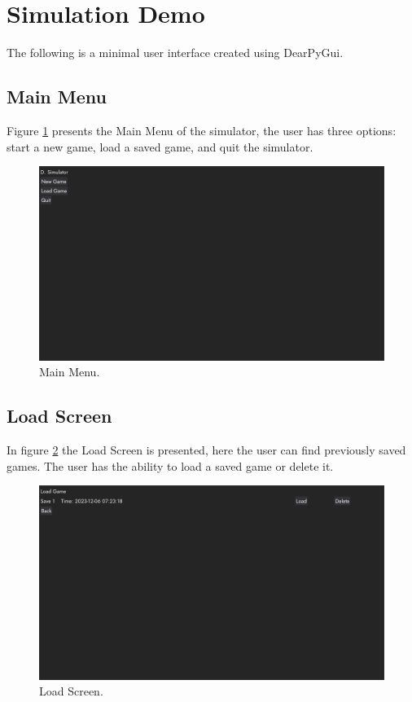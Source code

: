 \documentclass{article}
\begin{document}
\section{Simulation Demo}

The following is a minimal user interface created using DearPyGui.\cite{dearpygui_github}

\subsection{Main Menu} 
Figure \ref{fig:main_menu} presents the Main Menu of the simulator, the user has three options: start a new game, load a saved game, and quit the simulator.

\begin{figure}[H]
  \centering
  \includegraphics[width=1\textwidth]{main_menu.png}
  \caption{Main Menu.}
  \label{fig:main_menu}
\end{figure}

\subsection{Load Screen}
In figure \ref{fig:load_game} the Load Screen is presented, here the user can find previously saved games. The user has the ability to load a saved game or delete it.

\begin{figure}[H]
  \centering
  \includegraphics[width=1\textwidth]{load_game.png}
  \caption{Load Screen.}
  \label{fig:load_game}
\end{figure}
\end{document}
